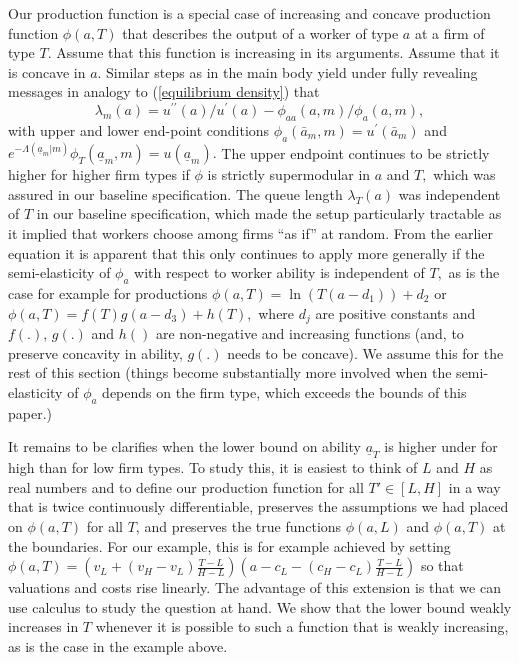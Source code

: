 \documentclass[12pt]{article}
\begin{document}
Our production function is a
special case of increasing and concave production function $\phi (a,T)$ that describes the
output of a worker of type $a$ at a firm of type $T.$ Assume that this function is increasing in its arguments. Assume that it is concave in $a$. Similar steps as in
the main body yield under fully revealing messages in analogy to (\ref{equilibrium density}) that 
\begin{equation}\label{generalized-queue-length}
\lambda
_{m}(a)=u^{\prime \prime }(a)/u^{\prime }(a)-\phi _{aa}(a,m)/\phi _{a}(a,m),
\end{equation}
with upper and lower end-point conditions $\phi _{a}(\bar{a}%
_{m},m)=u^{\prime }(\bar{a}_{m})$ and $e^{-\Lambda (\underline{a}
_{m}|m)} \phi_{T}(\underline{a}_{m},m) = u(\underline{a}_{m}).$ The upper
endpoint continues to be strictly higher for higher firm types if $\phi $ is
strictly supermodular in $a$ and $T,$ which was assured in our baseline
specification. The queue length $\lambda _{T}(a)$ was independent of $T$ in
our baseline specification, which made the setup particularly tractable as
it implied that workers choose among firms ``as if'' at random. From the
earlier equation it is apparent that this only continues to apply more
generally if the semi-elasticity of $\phi _{a}$ with respect to worker
ability is independent of $T,$ as is the case for example for productions $ 
\phi(a,T)=\ln (T(a-d_1))+d_2$ or $
\phi(a,T)=f(T)g(a-d_3)+h(T),$
where $d_j$ are
positive constants and $f(.)$, $g(.)$ and $h()$ are non-negative and
increasing functions (and, to preserve concavity in ability, $g(.)$ needs to be concave). We assume this for the rest of this section (things become substantially more involved when the semi-elasticity of $\phi
_{a}$ depends on the firm type, which exceeds the bounds of this paper.) 

It remains to be clarifies when the lower bound on ability $\underline{a}_T$ is higher under for high than for low firm types. To study this, it is easiest to think of $L$ and $H$ as real numbers and to define our production function for all $T' \in [L,H]$ in a way that is twice continuously differentiable, preserves the assumptions we had placed on $\phi(a,T)$ for all $T$, and preserves the true functions $\phi(a,L)$ and $\phi(a,T)$ at the boundaries. For our example, this is for example achieved by setting $\phi(a,T)=\left(v_L + (v_H - v_L) \frac{T-L}{H-L}\right) \left( a - c_L -  (c_H - c_L) \frac{T-L}{H-L} \right)$ so that valuations and costs rise linearly. The advantage of this extension is that we can use calculus to study the question at hand. We show that the lower bound weakly increases in $T$ whenever it is possible to such a function that is weakly increasing, as is the case in the example above.
\end{document}
